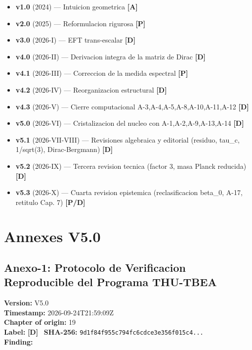 ﻿\documentclass[11pt,letterpaper]{article}
\begin{document}
\begin{itemize}[leftmargin=*]
\item \textbf{v1.0} (2024) --- Intuicion geometrica \textcolor{Ayellow}{\textbf{[A]}}
\item \textbf{v2.0} (2025) --- Reformulacion rigurosa \textcolor{Ppurple}{\textbf{[P]}}
\item \textbf{v3.0} (2026-I) --- EFT trans-escalar \textcolor{Dgreen}{\textbf{[D]}}
\item \textbf{v4.0} (2026-II) --- Derivacion integra de la matriz de Dirac \textcolor{Dgreen}{\textbf{[D]}}
\item \textbf{v4.1} (2026-III) --- Correccion de la medida espectral \textcolor{Ppurple}{\textbf{[P]}}
\item \textbf{v4.2} (2026-IV) --- Reorganizacion estructural \textcolor{Dgreen}{\textbf{[D]}}
\item \textbf{v4.3} (2026-V) --- Cierre computacional A-3,A-4,A-5,A-8,A-10,A-11,A-12 \textcolor{Dgreen}{\textbf{[D]}}
\item \textbf{v5.0} (2026-VI) --- Cristalizacion del nucleo con A-1,A-2,A-9,A-13,A-14 \textcolor{Dgreen}{\textbf{[D]}}
\item \textbf{v5.1} (2026-VII-VIII) --- Revisiones algebraica y editorial (residuo, tau\_c, 1/sqrt(3), Dirac-Bergmann) \textcolor{Dgreen}{\textbf{[D]}}
\item \textbf{v5.2} (2026-IX) --- Tercera revision tecnica (factor 3, masa Planck reducida) \textcolor{Dgreen}{\textbf{[D]}}
\item \textbf{v5.3} (2026-X) --- Cuarta revision epistemica (reclasificacion beta\_0, A-17, retitulo Cap. 7) \textcolor{Ppurple}{\textbf{[P/D]}}
\end{itemize}

\newpage
\section*{Annexes V5.0}

\subsection*{Anexo-1: Protocolo de Verificacion Reproducible del Programa THU-TBEA}
\textbf{Version:} V5.0 \\
\textbf{Timestamp:} 2026-09-24T21:59:09Z \\
\textbf{Chapter of origin:} 19 \\
\textbf{Label:} \textcolor{Dgreen}{\textbf{[D]}} \
\textbf{SHA-256:} \texttt{9d1f84f955c794fc6cdce3e356f015c4...} \\[0.5em]
\textbf{Finding:}
\end{document}
